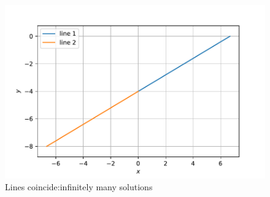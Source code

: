 \documentclass[journal,12pt,twocolumn]{IEEEtran}
\begin{document}
\begin{enumerate}
\begin{figure}[ht]
    \includegraphics[width= \columnwidth]{assignment2c.pdf}
    \caption{Lines coincide:infinitely many solutions}
    \label{fig:1}
\end{figure}



\end{enumerate}
\end{document}
